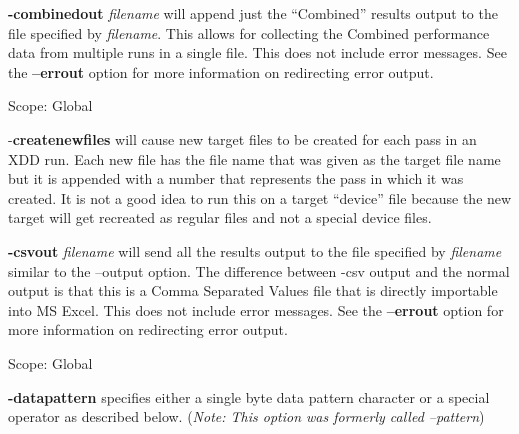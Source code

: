 \textbf{-combinedout} \emph{filename} will append just the ``Combined'' results output to the file specified by \emph{filename}. This allows for collecting the Combined performance data from multiple runs in a single file. This does not include error messages. See the \textbf{--errout} option for more information on redirecting error output.

Scope: Global

-\textbf{createnewfiles} will cause new target files to be created for each pass in an XDD run. Each new file has the file name that was given as the target file name but it is appended with a number that represents the pass in which it was created. It is not a good idea to run this on a target ``device'' file because the new target will get recreated as regular files and not a special device files.

\textbf{-csvout} \emph{filename} will send all the results output to the file specified by \emph{filename} similar to the --output option. The difference between -csv output and the normal output is that this is a Comma Separated Values file that is directly importable into MS Excel. This does not include error messages. See the \textbf{--errout} option for more information on redirecting error output.

Scope: Global

\textbf{-datapattern} specifies either a single byte data pattern character or a special operator as described below. (\emph{Note: This option was formerly called --pattern})

